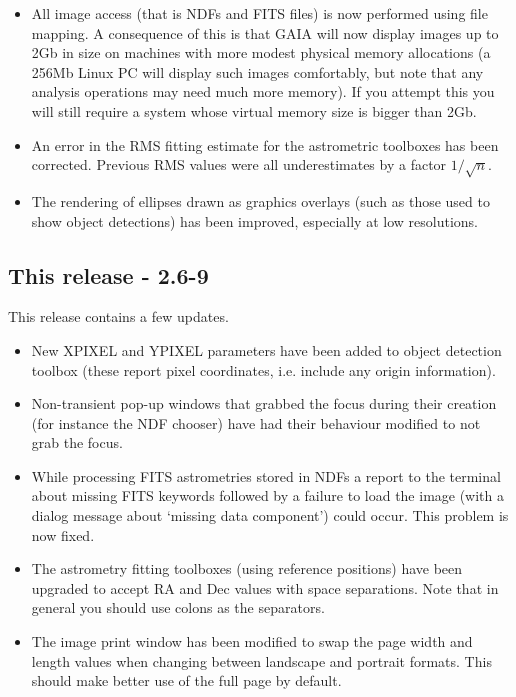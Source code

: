 \documentclass[twoside,11pt]{article}
\renewcommand{\_}{\texttt{\symbol{95}}}
\begin{document}
\begin{itemize}
     \item All image access (that is NDFs and FITS files) is now
       performed using file mapping. A consequence of this is that 
       GAIA will now display images up to 2Gb in size on machines with
       more modest physical memory allocations (a 256Mb Linux PC will
       display such images comfortably, but note that any analysis
       operations may need much more memory). If you attempt this
       you will still require a system whose virtual memory size is
       bigger than 2Gb.

     \item An error in the RMS fitting estimate for the astrometric
       toolboxes has been corrected. Previous RMS values were all
       underestimates by a factor $1/\sqrt{n}$.
     
     \item The rendering of ellipses drawn as graphics overlays (such
       as those used to show object detections) has been improved,
       especially at low resolutions.
\end{itemize}

\subsection{This release - 2.6-9}

This release contains a few updates. 
\begin{itemize}
   \item New X\_PIXEL and Y\_PIXEL parameters have been added to object
     detection toolbox (these report pixel coordinates, i.e. include
     any origin information).

   \item Non-transient pop-up windows that grabbed the focus during their
     creation (for instance the NDF chooser) have had their behaviour
     modified to not grab the focus.

   \item While processing FITS astrometries stored in NDFs a report to
     the terminal about missing FITS keywords followed by a failure to
     load the image (with a dialog message about `missing data
     component') could occur. This problem is now fixed.

   \item The astrometry fitting toolboxes (using reference positions) have
     been upgraded to accept RA and Dec values with space separations.
     Note that in general you should use colons as the separators.

   \item The image print window has been modified to swap the page width
     and length values when changing between landscape and portrait
     formats. This should make better use of the full page by default.


\end{itemize}
\end{document}
